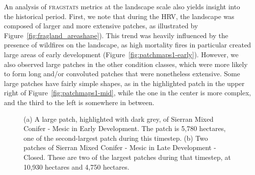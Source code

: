 
An analysis of \textsc{fragstats} metrics at the landscape scale also yields insight into the historical period. First, we note that during the HRV, the landscape was composed of larger and more extensive patches, as illustrated by Figure~\ref{fig:fragland_areashape}). This trend was heavily influenced by the presence of wildfires on the landscape, as high mortality fires in particular created large areas of early development (Figure~\ref{fig:patchmaps1-early}). However, we also observed large patches in the other condition classes, which were more likely to form long and/or convoluted patches that were nonetheless extensive. Some large patches have fairly simple shapes, as in the highlighted patch in the upper right of Figure~\ref{fig:patchmaps1-mid}, while the one in the center is more complex, and the third to the left is somewhere in between.

\begin{figure}[!htbp]
  \centering
  \caption{(a) A large patch, highlighted with dark grey, of Sierran Mixed Conifer - Mesic in Early Development. The patch is 5,780 hectares, one of the second-largest patch during this timestep. (b) Two patches of Sierran Mixed Conifer - Mesic in Late Development - Closed. These are two of the largest patches during that timestep, at 10,930 hectares and 4,750 hectares.} 
  \label{fig:patchmaps1}
\end{figure}


